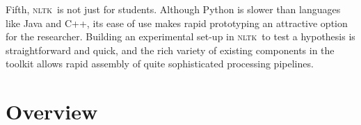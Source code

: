 \documentclass[11pt,a4paper]{article}
\newcommand{\DRT}{\textsc{drt}}
\newcommand{\NLTK}{\textsc{nltk}}
\begin{document}
Fifth, \NLTK\ is not just for students. Although Python is slower than
languages like Java and C++, its ease of use makes rapid prototyping
an attractive option for the researcher. Building an experimental
set-up in \NLTK\ to test a hypothesis is straightforward and quick,
and the rich variety of existing components in the toolkit allows
rapid assembly of quite sophisticated processing pipelines.




\section{Overview}
\label{sec:overview}

\end{document}

